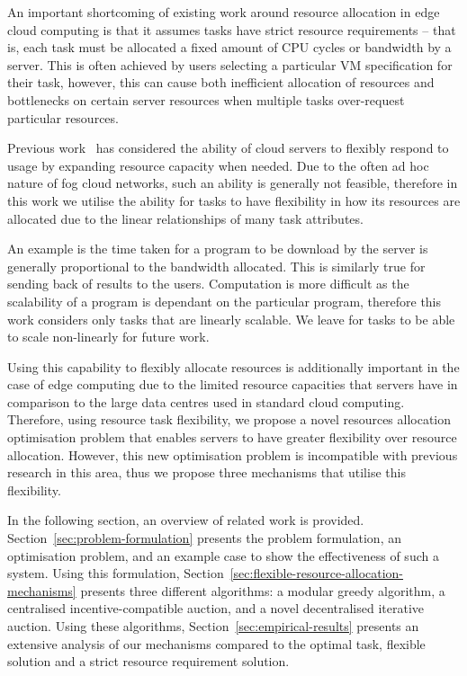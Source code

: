 An important shortcoming of existing work around resource allocation in edge cloud computing is that it assumes tasks
have strict resource requirements -- that is, each task must be allocated a fixed amount of CPU cycles or bandwidth by a
server. This is often achieved by users selecting a particular VM specification for their task, however, this can cause
both inefficient allocation of resources and bottlenecks on certain server resources when multiple tasks over-request
particular resources.

Previous work~\cite{ServerElasticity} has considered the ability of cloud servers to flexibly respond to usage by
expanding resource capacity when needed. Due to the often ad hoc nature of fog cloud networks, such an ability is
generally not feasible, therefore in this work we utilise the ability for tasks to have flexibility in how its
resources are allocated due to the linear relationships of many task attributes.

An example is the time taken for a program to be download by the server is
generally proportional to the bandwidth allocated. This is similarly true for sending back of results to the users.
Computation is more difficult as the scalability of a program is dependant on the particular program, therefore this
work considers only tasks that are linearly scalable. We leave for tasks to be able to scale non-linearly for future
work.

Using this capability to flexibly allocate resources is additionally important in the case of edge computing due to the
limited resource capacities that servers have in comparison to the large data centres used in standard cloud computing.
Therefore, using resource task flexibility, we propose a novel resources allocation optimisation problem that enables
servers to have greater flexibility over resource allocation. However, this new optimisation problem is
incompatible with previous research in this area, thus we propose three mechanisms that utilise this flexibility.

In the following section, an overview of related work is provided. Section~\ref{sec:problem-formulation} presents the
problem formulation, an optimisation problem, and an example case to show the effectiveness of such a system. Using this
formulation, Section~\ref{sec:flexible-resource-allocation-mechanisms} presents three different algorithms: a modular
greedy algorithm, a centralised incentive-compatible auction, and a novel decentralised iterative auction. Using these
algorithms, Section~\ref{sec:empirical-results} presents an extensive analysis of our mechanisms compared to the optimal
task, flexible solution and a strict resource requirement solution.
